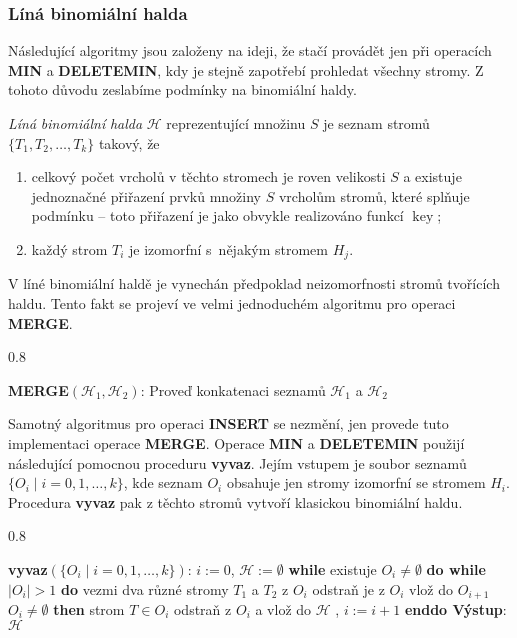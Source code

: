 \documentclass[a4paper,12pt]{article}
\DeclareMathOperator*{\key}{key}
\newcommand{\algoritmus}[1]{
  {
  \setlength\fboxrule{0.5pt}

  \begin{boxedminipage}{0.8\textwidth}

 #1
  \end{boxedminipage}

  }
  }
\begin{document}
\subsubsection{Líná binomiální halda}

Následující algoritmy jsou založeny na ideji, že 
 stačí provádět jen při operacích {\bf MIN} a 
{\bf DELETEMIN}, kdy je stejně zapotřebí prohledat všechny 
stromy. Z tohoto důvodu zeslabíme podmínky na 
binomiální haldy.

\emph{Líná} \emph{binomiální} \emph{halda} $\mathcal H$ 
reprezentující množinu $S$ je seznam stromů 
$\{T_1,T_2,\dots,T_k\}$ takový, že  
\begin{enumerate}
\item
celkový počet vrcholů v těchto stromech je 
roven velikosti $S$ a 
existuje jednoznačné přiřazení prvků množiny 
$S$ vrcholům stromů, které splňuje 
podmínku  -- toto přiřazení je jako obvykle 
realizováno funkcí $\key$;
\item
každý strom $T_i$ je izomorfní s~nějakým stromem $H_
j$.
\end{enumerate}

V líné binomiální haldě je vynechán předpoklad 
neizo\-morf\-nosti stromů tvořících haldu. Tento fakt se 
projeví ve velmi jednoduchém algoritmu pro operaci 
{\bf MERGE}.
\algoritmus{
{\bf MERGE$(\mathcal H_1,\mathcal H_2)$}:\newline 
Proveď konkatenaci seznamů $\mathcal H_1$ a $\mathcal H_2$
}

Samotný algoritmus pro operaci {\bf INSERT} se nezmění, jen 
provede tuto implementaci ope\-race {\bf MER\-GE}.  Ope\-race 
{\bf MIN} a {\bf DELETE\-MIN} použijí následující pomocnou 
proceduru {\bf vyvaz}.  Jejím vstu\-pem je soubor 
seznamů $\{O_i\mid i=0,1,\dots,k\}$, kde seznam $O_i$ 
obsahuje jen stromy izomorfní se stromem $H_i$.  
Procedura {\bf vyvaz} pak z těchto stromů vytvoří 
klasickou binomiální hal\-du. 

\algoritmus{{\bf vyvaz$(\{O_i\mid i=0,1,\dots,k\})$}:\newline 
$i:=0$, $\mathcal H:=\emptyset$\newline 
{\bf while} existuje $O_i\ne\emptyset$ {\bf do\newline 
\phantom{{\rm ---}}while} $|O_i|>1$ {\bf do\newline 
\phantom{{\rm ------}}}vezmi dva různé stromy $T_1$ a $
T_2$ z 
$O_i$\newline 
\phantom{------}odstraň je z $O_i$\newline 
\phantom{------}{\bf spoj$(T_1,T_2)$} vlož do $O_{i+1}$\newline 
\phantom{---}{\bf enddo\newline 
\phantom{{\rm ---}}if} $O_i\ne\emptyset$ {\bf then\newline 
\phantom{{\rm ------}}}strom $T\in O_i$ odstraň z $O_i$ a vlož do $
\mathcal H$\newline 
\phantom{---}{\bf endif},\newline 
\phantom{---}$i:=i+1$\newline 
{\bf enddo\newline 
Výstup}: $\mathcal H$}
\end{document}
